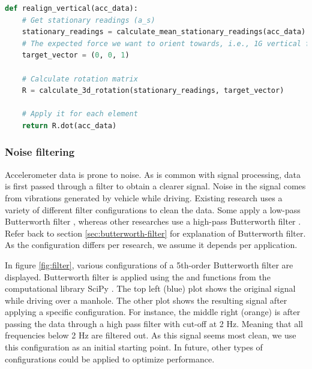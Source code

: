\begin{minipage}{.95\textwidth}
\begin{lstlisting}[language=Python, caption={Pseudo implementation of reorienting accelerometer data vertically. Implementation for the second rotation matrix is similar. Except then we use mean readings while braking, and calculate a 2D rotation matrix.}, label={list:realign_vertical}]
def realign_vertical(acc_data):
    # Get stationary readings (a_s)
    stationary_readings = calculate_mean_stationary_readings(acc_data)
    # The expected force we want to orient towards, i.e., 1G vertical force
    target_vector = (0, 0, 1)

    # Calculate rotation matrix
    R = calculate_3d_rotation(stationary_readings, target_vector)
    
    # Apply it for each element
    return R.dot(acc_data)
\end{lstlisting}
\end{minipage}




\subsubsection{Noise filtering}
Accelerometer data is prone to noise. As is common with signal processing, data is first passed through a filter to obtain a clearer signal. Noise in the signal comes from vibrations generated by vehicle while driving. Existing research uses a variety of different filter configurations to clean the data. Some apply a low-pass Butterworth filter \cite{Gupta2020}, whereas other researches use a high-pass Butterworth filter \cite{Wu2020, Janani2020}. Refer back to section \ref{sec:butterworth-filter} for explanation of Butterworth filter. As the configuration differs per research, we assume it depends per application. 

In figure \ref{fig:filter}, various configurations of a 5th-order Butterworth filter are displayed. Butterworth filter is applied using the  and  functions from the computational library SciPy \cite{scipy}. The top left (blue) plot shows the original signal while driving over a manhole. The other plot shows the resulting signal after applying a specific configuration. For instance, the middle right (orange) is after passing the data through a high pass filter with cut-off at 2 Hz. Meaning that all frequencies below 2 Hz are filtered out. As this signal seems most clean, we use this configuration as an initial starting point. In future, other types of configurations could be applied to optimize performance.


